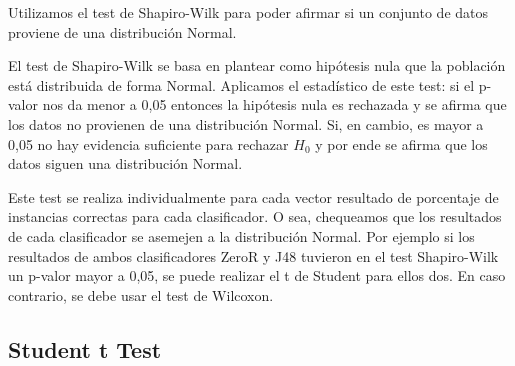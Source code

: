 

Utilizamos el test de Shapiro-Wilk para poder afirmar si un conjunto de datos proviene de una distribución Normal.


El test de Shapiro-Wilk se basa en plantear como hipótesis nula que la población está distribuida de forma Normal. Aplicamos el estadístico de este test: si el p-valor nos da menor a 0,05 entonces la hipótesis nula es rechazada y se afirma que los datos no provienen de una distribución Normal. Si, en cambio, es mayor a 0,05 no hay evidencia suficiente para rechazar $H_0$ y por ende se afirma que los datos siguen una distribución Normal.

Este test se realiza individualmente para cada vector resultado de porcentaje de instancias correctas para cada clasificador. O sea, chequeamos que los resultados de cada clasificador se asemejen a la distribución Normal. Por ejemplo si los resultados de ambos clasificadores ZeroR y J48 tuvieron en el test Shapiro-Wilk un p-valor mayor a 0,05, se puede realizar el t de Student para ellos dos. En caso contrario, se debe usar el test de Wilcoxon.

\subsection{Student t Test}


